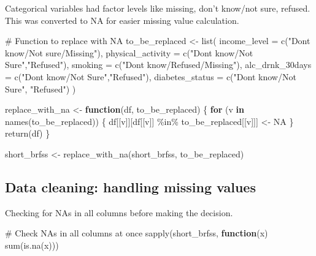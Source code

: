 \documentclass[
  letterpaper,
  DIV=11,
  numbers=noendperiod]{scrartcl}
\newenvironment{Shaded}{\begin{snugshade}}{\end{snugshade}}
\newcommand{\AttributeTok}[1]{\textcolor[rgb]{0.40,0.45,0.13}{#1}}
\newcommand{\CommentTok}[1]{\textcolor[rgb]{0.37,0.37,0.37}{#1}}
\newcommand{\ConstantTok}[1]{\textcolor[rgb]{0.56,0.35,0.01}{#1}}
\newcommand{\ControlFlowTok}[1]{\textcolor[rgb]{0.00,0.23,0.31}{\textbf{#1}}}
\newcommand{\FunctionTok}[1]{\textcolor[rgb]{0.28,0.35,0.67}{#1}}
\newcommand{\NormalTok}[1]{\textcolor[rgb]{0.00,0.23,0.31}{#1}}
\newcommand{\OtherTok}[1]{\textcolor[rgb]{0.00,0.23,0.31}{#1}}
\newcommand{\SpecialCharTok}[1]{\textcolor[rgb]{0.37,0.37,0.37}{#1}}
\newcommand{\StringTok}[1]{\textcolor[rgb]{0.13,0.47,0.30}{#1}}
\begin{document}
Categorical variables had factor levels like missing, don't know/not
sure, refused. This was converted to NA for easier missing value
calculation.

\begin{Shaded}
\begin{Highlighting}[]
\CommentTok{\# Function to replace with NA}
\NormalTok{to\_be\_replaced }\OtherTok{\textless{}{-}} \FunctionTok{list}\NormalTok{(}
  \AttributeTok{income\_level =} \FunctionTok{c}\NormalTok{(}\StringTok{"Don\textquotesingle{}t know/Not sure/Missing"}\NormalTok{),}
  \AttributeTok{physical\_activity =} \FunctionTok{c}\NormalTok{(}\StringTok{"Don\textquotesingle{}t know/Not Sure"}\NormalTok{,}\StringTok{"Refused"}\NormalTok{),}
  \AttributeTok{smoking         =} \FunctionTok{c}\NormalTok{(}\StringTok{"Don\textquotesingle{}t know/Refused/Missing"}\NormalTok{),}
  \AttributeTok{alc\_drnk\_30days =} \FunctionTok{c}\NormalTok{(}\StringTok{"Don\textquotesingle{}t know/Not Sure"}\NormalTok{,}\StringTok{"Refused"}\NormalTok{),}
  \AttributeTok{diabetes\_status =} \FunctionTok{c}\NormalTok{(}\StringTok{"Don\textquotesingle{}t know/Not Sure"}\NormalTok{, }\StringTok{"Refused"}\NormalTok{)}
\NormalTok{  )}

\NormalTok{replace\_with\_na }\OtherTok{\textless{}{-}} \ControlFlowTok{function}\NormalTok{(df, to\_be\_replaced) \{}
  \ControlFlowTok{for}\NormalTok{ (v }\ControlFlowTok{in} \FunctionTok{names}\NormalTok{(to\_be\_replaced)) }
\NormalTok{    \{}
\NormalTok{    df[[v]][df[[v]] }\SpecialCharTok{\%in\%}\NormalTok{ to\_be\_replaced[[v]]] }\OtherTok{\textless{}{-}} \ConstantTok{NA}
\NormalTok{    \}}
  \FunctionTok{return}\NormalTok{(df)}
\NormalTok{  \}}


\NormalTok{short\_brfss }\OtherTok{\textless{}{-}} \FunctionTok{replace\_with\_na}\NormalTok{(short\_brfss, to\_be\_replaced)}
\end{Highlighting}
\end{Shaded}

\subsection{Data cleaning: handling missing
values}\label{data-cleaning-handling-missing-values}

Checking for NAs in all columns before making the decision.

\begin{Shaded}
\begin{Highlighting}[]
\CommentTok{\# Check NAs in all columns at once}
\FunctionTok{sapply}\NormalTok{(short\_brfss, }\ControlFlowTok{function}\NormalTok{(x) }\FunctionTok{sum}\NormalTok{(}\FunctionTok{is.na}\NormalTok{(x)))}
\end{Highlighting}
\end{Shaded}
\end{document}
